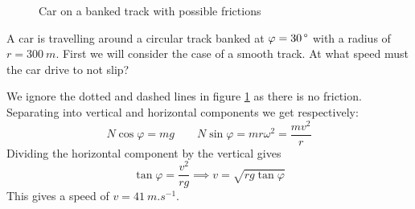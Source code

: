 \documentclass{article}
\begin{document}
    \example
    \begin{figure}[ht]
        \centering
        \caption{Car on a banked track with possible frictions}
        \label{fig:banked track}
    \end{figure}
    A car is travelling around a circular track banked at \(\varphi = \SI{30}{\SIUnitSymbolDegree}\) with a radius of \(r = \SI{300}{m}\).
    First we will consider the case of a smooth track.
    At what speed must the car drive to not slip?
    
    We ignore the dotted and dashed lines in figure \ref{fig:banked track} as there is no friction.
    Separating into vertical and horizontal components we get respectively:
    \[N\cos\varphi = mg \qquad N\sin\varphi = mr\omega^2 = \frac{mv^2}{r}\]
    Dividing the horizontal component by the vertical gives
    \[\tan\varphi = \frac{v^2}{rg} \implies v = \sqrt{rg\tan\varphi}\]
    This gives a speed of \(v = \SI{41}{m.s^{-1}}\).
    
\end{document}
